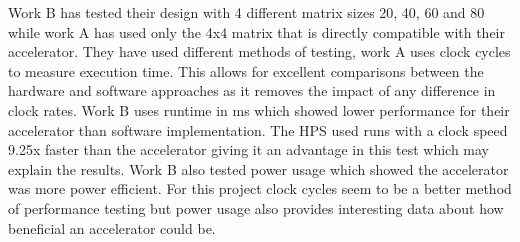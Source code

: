 Work B has tested their design with 4 different matrix sizes 20, 40, 60 and 80 while work A has used only the 4x4 matrix that is directly compatible with their accelerator. They have used different methods of testing, work A uses clock cycles to measure execution time. This allows for excellent comparisons between the hardware and software approaches as it removes the impact of any difference in clock rates. Work B uses runtime in ms which showed lower performance for their accelerator than software implementation. The HPS used runs with a clock speed 9.25x faster than the accelerator giving it an advantage in this test which may explain the results. Work B also tested power usage which showed the accelerator was more power efficient. For this project clock cycles seem to be a better method of performance testing but power usage also provides interesting data about how beneficial an accelerator could be.